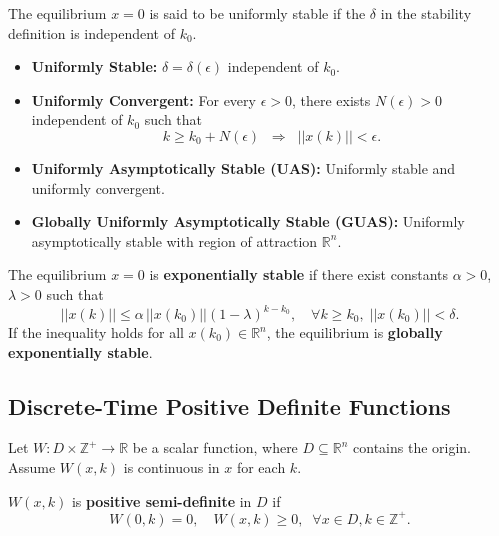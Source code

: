 \begin{definition}
The equilibrium $x=0$ is said to be uniformly stable if the $\delta$ in the stability definition is independent of $k_0$.  
\begin{itemize}
    \item \textbf{Uniformly Stable:} $\delta = \delta(\epsilon)$ independent of $k_0$.  
    \item \textbf{Uniformly Convergent:} For every $\epsilon>0$, there exists $N(\epsilon)>0$ independent of $k_0$ such that
    \begin{equation}
    k \ge k_0 + N(\epsilon) \;\; \Rightarrow \;\; ||x(k)|| < \epsilon.
    \end{equation}
    \item \textbf{Uniformly Asymptotically Stable (UAS):} Uniformly stable and uniformly convergent.  
    \item \textbf{Globally Uniformly Asymptotically Stable (GUAS):} Uniformly asymptotically stable with region of attraction $\mathbb{R}^n$.  
\end{itemize}
\end{definition}

\begin{definition}
The equilibrium $x=0$ is \textbf{exponentially stable} if there exist constants $\alpha>0$, $\lambda>0$ such that
\begin{equation}
||x(k)|| \leq \alpha \, ||x(k_0)|| (1-\lambda)^{k-k_0}, \quad \forall k \ge k_0, \; ||x(k_0)|| < \delta.
\end{equation}
If the inequality holds for all $x(k_0)\in\mathbb{R}^n$, the equilibrium is \textbf{globally exponentially stable}.
\end{definition}

\subsection{Discrete-Time Positive Definite Functions}
Let $W : D \times \mathbb{Z}^+ \to \mathbb{R}$ be a scalar function, where $D \subseteq \mathbb{R}^n$ contains the origin. Assume $W(x,k)$ is continuous in $x$ for each $k$.  

\begin{definition}
$W(x,k)$ is \textbf{positive semi-definite} in $D$ if
\begin{equation}
W(0,k) = 0, \quad W(x,k) \ge 0, \;\; \forall x\in D, k \in \mathbb{Z}^+.
\end{equation}
\end{definition}

